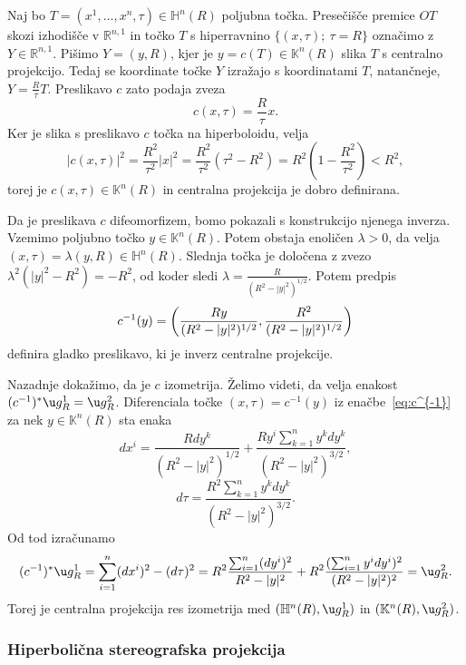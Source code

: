 \documentclass[a4paper]{article}
\begin{document}
Naj bo $T=(x^{1}, \dots , x^{n}, \tau) \in \mathbb{H}^{n}(R)$ poljubna točka. Presečišče premice $OT$ skozi izhodišče v $\mathbb{R}^{n,1}$ in točko $T$ s hiperravnino $\{ (x, \tau); \ \tau=R \}$ označimo z $Y \in \mathbb{R}^{n,1}$. Pišimo $Y=(y,R)$, kjer je $y = c(T) \in \mathbb{K}^{n}(R)$ slika $T$ s centralno projekcijo. 
Tedaj se koordinate točke $Y$ izražajo s koordinatami $T$, natančneje, $Y=\frac{R}{\tau} T$. Preslikavo $c$ zato podaja zveza
\begin{equation}\label{eq: cent-proj}
c(x, \tau) = \frac{R}{\tau} x.
\end{equation}
Ker je slika s preslikavo $c$ točka na hiperboloidu, velja
\[ |c(x,\tau)|^2 = \frac{R^2}{\tau^2} |x|^2 = \frac{R^2}{\tau^2}(\tau^2-R^2) = R^2 \left(1-\frac{R^2}{\tau^2} \right) < R^2, \]
torej je $c(x, \tau) \in \mathbb{K}^{n}(R)$ in centralna projekcija je dobro definirana.

Da je preslikava $c$ difeomorfizem, bomo pokazali s konstrukcijo njenega inverza.
Vzemimo poljubno točko $y \in \mathbb{K}^{n}(R)$. Potem obstaja enoličen $\lambda>0$, da velja $(x, \tau) = \lambda (y,R) \in \mathbb{H}^{n}(R)$. Slednja točka je določena z zvezo $\lambda^2 (|y|^2-R^2)=-R^2$, od koder sledi $\lambda = \frac{R}{(R^2-|y|^2)^{1/2}}$.
Potem predpis
\begin{equation}\label{eq:c^{-1}}
c^{-1}(y) = \left( \frac{Ry}{(R^2-|y|^2)^{1/2}}, \frac{R^2}{(R^2-|y|^2)^{1/2}} \right)
\end{equation}
definira gladko preslikavo, ki je inverz centralne projekcije.

Nazadnje dokažimo, da je $c$ izometrija. Želimo videti, da velja enakost $(c^{-1})^{*} \u g_{R}^{1} = \u g_{R}^{2}$.
Diferenciala točke $(x, \tau) = c^{-1}(y)$ iz enačbe~\ref{eq:c^{-1}} za nek $y \in \mathbb{K}^{n}(R)$ sta enaka
\[ dx^{i} = \frac{Rdy^{k}}{(R^2-|y|^2)^{1/2}} + \frac{Ry^{i} \sum_{k=1}^{n}y^{k}dy^{k}}{(R^2-|y|^2)^{3/2}}, \]
\[ d\tau = \frac{R^2 \sum_{k=1}^{n}y^{k}dy^{k}}{(R^2-|y|^2)^{3/2}}. \]
Od tod izračunamo
\[ (c^{-1})^{*} \u g_{R}^{1} = \sum_{i=1}^{n} (dx^{i})^2 - (d\tau)^2 = R^2 \frac{\sum_{i=1}^{n}(dy^{i})^2}{R^2-|y|^2} + R^2 \frac{(\sum_{i=1}^{n}y^{i}dy^{i})^2}{(R^2-|y|^2)^2} = \u g_{R}^{2}. \]
Torej je centralna projekcija res izometrija med $(\mathbb{H}^{n}(R), \u g_{R}^{1})$ in $(\mathbb{K}^{n}(R), \u g_{R}^{2})$.

\subsubsection{Hiperbolična stereografska projekcija}
\end{document}
